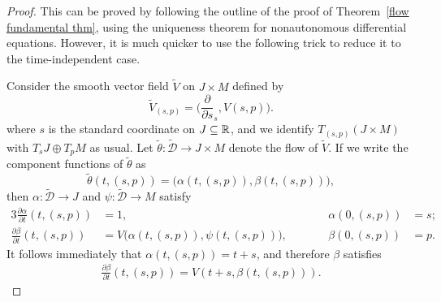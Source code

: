 \begin{proof}
This can be proved by following the outline of the proof of Theorem~\ref{flow fundamental thm}, using the uniqueness theorem for nonautonomous differential equations. However, it is much quicker to use the following trick to reduce it to the time-independent case.\par
Consider the smooth vector field $\widetilde{V}$ on $J\times M$ defined by
\[\widetilde{V}_{(s,p)}=\Big(\frac{\partial}{\partial s}_s,V(s,p)\Big).\]
where $s$ is the standard coordinate on $J\subseteq\mathbb{R}$, and we identify $T_{(s,p)}(J\times M)$ with $T_sJ\oplus T_pM$ as usual. Let $\widetilde{\theta}:\widetilde{\mathcal{D}}\to J\times M$ denote the flow of $\widetilde{V}$. If we write the component functions of $\widetilde{\theta}$ as
\[\widetilde{\theta}(t,(s,p))=\big(\alpha(t,(s,p)),\beta(t,(s,p))\big),\]
then $\alpha:\widetilde{\mathcal{D}}\to J$ and $\psi:\widetilde{\mathcal{D}}\to M$ satisfy
\begin{alignat*}{3}
\frac{\partial\alpha}{\partial t}(t,(s,p))&=1,&\quad\quad&\alpha(0,(s,p))&=s;&\\
\frac{\partial\beta}{\partial t}(t,(s,p))&=V\big(\alpha(t,(s,p)),\psi(t,(s,p))\big),&\quad\quad&\beta(0,(s,p))&=p.&
\end{alignat*}
It follows immediately that $\alpha(t,(s,p))=t+s$, and therefore $\beta$ satisfies
\begin{align}\label{flow fundamental thm time-dependent-2}
\frac{\partial\beta}{\partial t}(t,(s,p))=V(t+s,\beta(t,(s,p))).
\end{align}


\end{proof}
